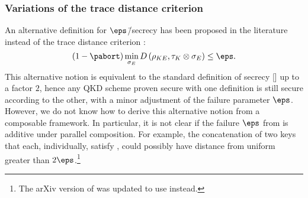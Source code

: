 

\subsubsection{Variations of the trace distance criterion}
\label{sec:qkd.other.variations}

An alternative definition for $\eps$\=/secrecy has been proposed in the literature instead of the trace distance criterion \cite{TSSR10,TLGR12}:
\begin{equation}\label{eq:alternative.sec}
  (1-\pabort)\min_{\sigma_E}D\left(\rho_{KE}, \tau_K \otimes
    \sigma_E\right) \leq \eps.\end{equation}
This alternative notion is equivalent to the standard definition of secrecy [] up to a factor $2$, hence any QKD scheme proven secure with one definition is  still secure according to the other, with a minor adjustment of the failure parameter $\eps$. However, we do not know how to derive this alternative notion from a  composable framework. In particular, it is not clear if the failure $\eps$ from  is additive under parallel composition. For example, the concatenation of two keys that each, individually, satisfy , could possibly have distance from uniform greater than $2\eps$.\footnote{The arXiv version of \textcite{TLGR12} was updated to use  instead.}


